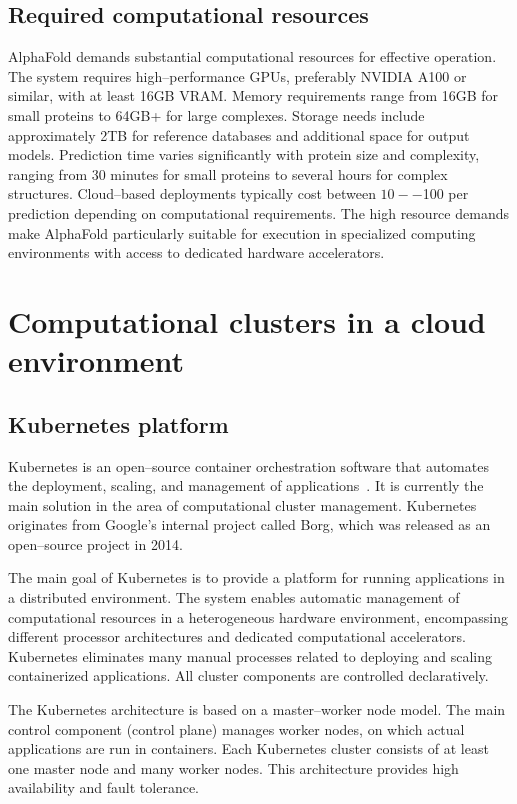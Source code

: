 \subsection{Required computational resources}

AlphaFold demands substantial computational resources for effective operation.
The system requires high--performance GPUs, preferably NVIDIA A100 or similar, with at least 16GB VRAM. Memory requirements range from 16GB for small proteins to 64GB+ for large complexes.
Storage needs include approximately 2TB for reference databases and additional space for output models.
Prediction time varies significantly with protein size and complexity, ranging from 30 minutes for small proteins to several hours for complex structures.
Cloud--based deployments typically cost between $10--$100 per prediction depending on computational requirements.
The high resource demands make AlphaFold particularly suitable for execution in specialized computing environments with access to dedicated hardware accelerators.


\section{Computational clusters in a cloud environment}

\subsection{Kubernetes platform}

Kubernetes is an open--source container orchestration software that automates the deployment, scaling, and management of applications~\cite{kubernetes, container_orchestration}.
It is currently the main solution in the area of computational cluster management.
Kubernetes originates from Google's internal project called Borg, which was released as an open--source project in 2014.

The main goal of Kubernetes is to provide a platform for running applications in a distributed environment.
The system enables automatic management of computational resources in a heterogeneous hardware environment, encompassing different processor architectures and dedicated computational accelerators.
Kubernetes eliminates many manual processes related to deploying and scaling containerized applications.
All cluster components are controlled declaratively.

The Kubernetes architecture is based on a master--worker node model.
The main control component (control plane) manages worker nodes, on which actual applications are run in containers.
Each Kubernetes cluster consists of at least one master node and many worker nodes.
This architecture provides high availability and fault tolerance.

